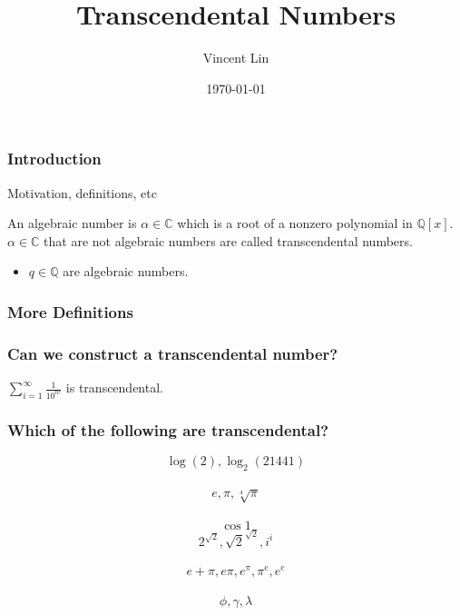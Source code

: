 \documentclass{beamer}
\title{Transcendental Numbers}
\author{Vincent Lin}
\date{\today}
\begin{document}

\begin{frame}
    \titlepage{}
\end{frame}



\begin{frame}
	\frametitle{Introduction}
	Motivation, definitions, etc

    \begin{definition}
        An \alert{algebraic number} is $\alpha \in \mathbb{C}$ which is a root of a nonzero polynomial in $\mathbb{Q}[x]$. $\alpha \in \mathbb{C}$ that are not algebraic numbers are called \alert{transcendental numbers}.
    \end{definition}

 	\begin{example}
		\begin{itemize}
		    \item{$q \in \mathbb{Q}$ are algebraic numbers.}
		\end{itemize}
	\end{example} 
\end{frame}

\begin{frame}
    \frametitle{More Definitions}
\end{frame}

\begin{frame}
    \frametitle{Can we construct a transcendental number?}
    \begin{theorem}
        $\sum\limits_{i = 1}^{\infty}\frac{1}{10^{n!}}$ is transcendental.
    \end{theorem}
\end{frame}
\begin{frame}
	\frametitle{Which of the following are transcendental?}
	
    \[\log(2), \log_{2}(21441)\] \\ \[e, \pi, \sqrt[4]{\pi}\] \\ \[\cos{1}\] \[2^{\sqrt{2}}, {\sqrt{2}}^{\sqrt{2}}, {i}^{i}\] \\ \[e + \pi, e\pi, e^{\pi}, {\pi}^{e}, {e}^{e}\] \\ \[\phi, \gamma, \lambda\]
	
\end{frame}
\end{document}
